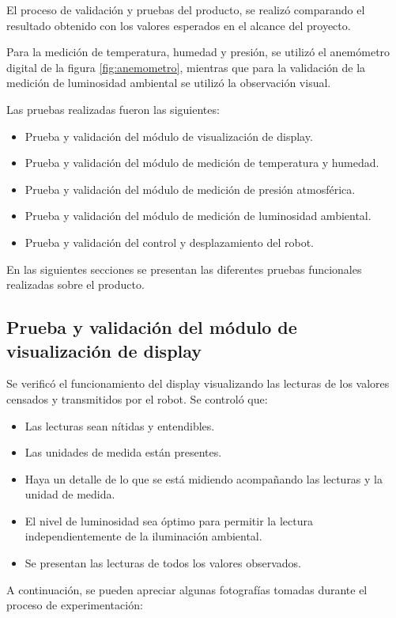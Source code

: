 El proceso de validación y pruebas del producto, se realizó comparando el resultado obtenido con los valores esperados en el alcance del proyecto.

Para la medición de temperatura, humedad y presión, se utilizó el anemómetro digital de la figura \ref{fig:anemometro}, mientras que para la validación de la medición de luminosidad ambiental se utilizó la observación visual.

Las pruebas realizadas fueron las siguientes:
\begin{itemize}
	\item Prueba y validación del módulo de visualización de display.
	\item Prueba y validación del módulo de medición de temperatura y humedad.
	\item Prueba y validación del módulo de medición de presión atmosférica.
	\item Prueba y validación del módulo de medición de luminosidad ambiental.
	\item Prueba y validación del control y desplazamiento del robot.
\end{itemize}

En las siguientes secciones se presentan las diferentes pruebas funcionales realizadas sobre el producto.


\subsection{Prueba y validación del módulo de visualización de display}

Se verificó el funcionamiento del display visualizando las lecturas de los valores censados y transmitidos por el robot. Se controló que:

\begin{itemize}
	\item Las lecturas sean nítidas y entendibles.
	\item Las unidades de medida están presentes.
	\item Haya un detalle de lo que se está midiendo acompañando las lecturas y la unidad de medida.
	\item El nivel de luminosidad sea óptimo para permitir la lectura independientemente de la iluminación ambiental.
	\item Se presentan las lecturas de todos los valores observados.
\end{itemize}


A continuación, se pueden apreciar algunas fotografías tomadas durante el proceso de experimentación:

